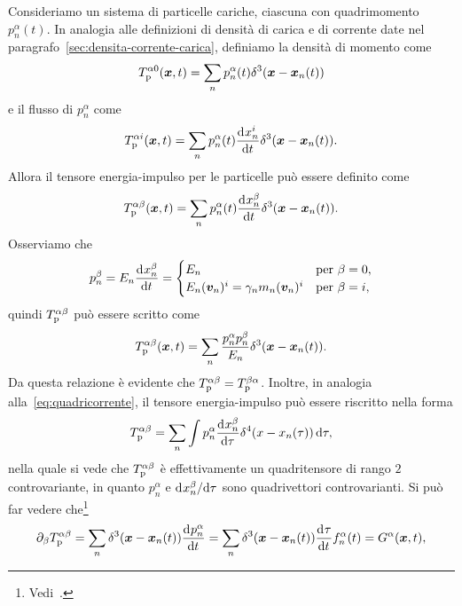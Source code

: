 Consideriamo un sistema di particelle cariche, ciascuna con quadrimomento
$p_{n}^{\alpha}(t)$.  In analogia alle definizioni di densità di carica e di
corrente date nel paragrafo~\ref{sec:densita-corrente-carica}, definiamo la
densità di momento come
\begin{equation}
  T_{\textup{p}}^{\alpha0}(\bm{x}, t) = \sum_{n} p_{n}^{\alpha}(t)
  \delta^{3}(\bm{x} - \bm{x}_{n}(t))
\end{equation}
e il flusso di $p_{n}^{\alpha}$ come
\begin{equation}
  T_{\textup{p}}^{\alpha i}(\bm{x}, t) = \sum_{n} p_{n}^{\alpha}(t)
  \frac{{\mathop{}\!\mathrm{d}^{}}x_{n}^{i}}{\mathop{}\!\mathrm{d} {t}^{}} \delta^{3}(\bm{x} - \bm{x}_{n}(t)).
\end{equation}
Allora il tensore energia-impulso per le particelle può essere definito come
\begin{equation}
  T_{\textup{p}}^{\alpha\beta}(\bm{x}, t) = \sum_{n} p_{n}^{\alpha}(t)
  \frac{{\mathop{}\!\mathrm{d}^{}}x_{n}^{\beta}}{\mathop{}\!\mathrm{d} {t}^{}} \delta^{3}(\bm{x} - \bm{x}_{n}(t)).
\end{equation}
Osserviamo che
\begin{equation}
  p_{n}^{\beta} = E_{n} \frac{{\mathop{}\!\mathrm{d}^{}}x_{n}^{\beta}}{\mathop{}\!\mathrm{d} {t}^{}} =
  \begin{cases}
    E_{n} & \text{per $\beta = 0$}, \\
    E_{n}(\bm{v}_{n})^{i} = \gamma_{n}m_{n}(\bm{v}_{n})^{i} & \text{per $\beta =
      i$},
  \end{cases}
\end{equation}
quindi $T_{\textup{p}}^{\alpha\beta}$ può essere scritto come
\begin{equation}
  T_{\textup{p}}^{\alpha\beta}(\bm{x}, t) = \sum_{n} \frac{p_{n}^{\alpha}
    p_{n}^{\beta}}{E_{n}} \delta^{3}(\bm{x} - \bm{x}_{n}(t)).
\end{equation}
Da questa relazione è evidente che
$T_{\textup{p}}^{\alpha\beta} = T_{\textup{p}}^{\beta\alpha}$.  Inoltre, in
analogia alla~\eqref{eq:quadricorrente}, il tensore energia-impulso può essere
riscritto nella forma
\begin{equation}
  T_{\textup{p}}^{\alpha\beta} = \sum_{n} \int p_{n}^{\alpha}
  \frac{{\mathop{}\!\mathrm{d}^{}}x_{n}^{\beta}}{\mathop{}\!\mathrm{d} {\tau}^{}} \delta^{4}(x - x_{n}(\tau))\mathop{}\!\mathrm{d} \tau,
\end{equation}
nella quale si vede che $T_{\textup{p}}^{\alpha\beta}$ è effettivamente un
quadritensore di rango $2$ controvariante, in quanto $p_{n}^{\alpha}$ e
$\mathrm{d}^{}x_{n}^{\beta} / \mathrm{d} {\tau}^{}$ sono quadrivettori controvarianti.  Si può far
vedere che\footnote{Vedi~\textcite[44]{weinberg:gravitation}.}
\begin{equation}
  \partial_{\beta}T_{\textup{p}}^{\alpha\beta} = \sum_{n}
  \delta^{3}(\bm{x} - \bm{x}_{n}(t)) \frac{{\mathop{}\!\mathrm{d}^{}}p_{n}^{\alpha}}{\mathop{}\!\mathrm{d} {t}^{}} = \sum_{n}
  \delta^{3}(\bm{x} - \bm{x}_{n}(t)) \frac{{\mathop{}\!\mathrm{d}^{}}\tau}{\mathop{}\!\mathrm{d} {t}^{}}f_{n}^{\alpha}(t) =
  G^{\alpha}(\bm{x}, t),
\end{equation}
